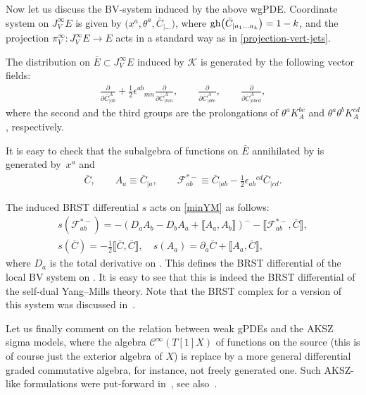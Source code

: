 \documentclass[10pt,a4paper]{amsart}
\numberwithin{equation}{section}
\theoremstyle{definition}
\renewcommand{\tilde}{\widetilde}
\newcommand{\cC}{\mathcal{C}}
\def\cK{\mathcal{K}}
\newcommand{\lb}{\llbracket}
\newcommand{\rb}{\rrbracket}
\newcommand{\vprol}{\tilde}
\begin{document}
Now let us discuss the BV-system induced by the above wgPDE. Coordinate system on $J^{\infty}_VE$ is given by $\bigl(x^a,\theta^a,\bar{C}_{|\dots}\bigr)$, where ${\rm gh}\bigl(\bar{C}_{|a_1\dots a_k}\bigr)=1-k$, and the projection $\pi^{\infty}_{V}\colon J^{\infty}_V E\rightarrow E$ acts in a standard way as in \eqref{projection-vert-jets}.

The distribution \smash{$\vprol{\cK}_0$} on $\bar E\subset J^\infty_VE$ induced by $\cK$ is generated by the following vector fields:
\begin{gather*}
 \frac{\partial}{\partial \bar{C}^A_{|ab}}+\frac{1}{2}\epsilon^{ab}_{\,\,\,\,\,\,mn}\frac{\partial}{\partial \bar{C}^A_{|mn}},
 \qquad \frac{\partial}{\partial \bar{C}^A_{|abc}},
 \qquad \frac{\partial}{\partial \bar{C}^A_{|abcd}},
\end{gather*}
where the second and the third groups are the prolongations of $\theta^aK^{bc}_A$ and $\theta^a\theta^bK^{cd}_A$, respectively.

It is easy to check that the subalgebra of functions on $\bar{E}$ annihilated by \smash{$\vprol{\cK}_0$} is generated by~$x^a$ and
\begin{gather*}
 \bar{C},\qquad A_a\equiv \bar{C}_{|a},\qquad
 \mathcal{F}^{*-}_{ab}\equiv \bar{C}_{|ab}-\frac{1}{2}\epsilon_{ab}{}^{cd}\bar{C}_{|cd}.\label{minYM}
 \end{gather*}

The induced BRST differential $s$ acts on \eqref{minYM} as follows:
\begin{gather*}%
 s( \mathcal{F}^{*-}_{ab})=-(D_aA_b-D_bA_a+\lb A_a,A_b\rb)^{-}-\lb\mathcal{F}^{*-}_{ab},\bar{C}\rb,\\
 s(\bar{C})=-\frac{1}{2}\lb\bar{C},\bar{C}\rb,\quad s(A_a)=\partial_a\bar{C}+\lb A_a,\bar{C}\rb,
\end{gather*}
where $D_a$ is the total derivative on \smash{$J^\infty \bigl(\bar E/\vprol{\cK}_0\bigr)$}. This defines the BRST differential of the local BV system on \smash{$J^\infty \bigl(\bar E/\vprol{\cK}_0\bigr)$}. It is easy to see that this is indeed the BRST differential of the self-dual Yang--Mills theory. Note that the BRST complex for a version of this system was discussed in~\cite{Lyakhovich:2007cw}.

Let us finally comment on the relation between weak gPDEs and the AKSZ sigma models, where the algebra $\cC^\infty(T[1]X)$ of functions on the source (this is of course just the exterior algebra of $X$) is replace by a more general differential graded commutative algebra, for instance, not freely generated one. Such AKSZ-like formulations were put-forward in~\cite{costello2011renormalization}, see also~\cite{Bonechi:2022aji,Bonechi:2009kx,Grigoriev:2025vsl}.
\end{document}
